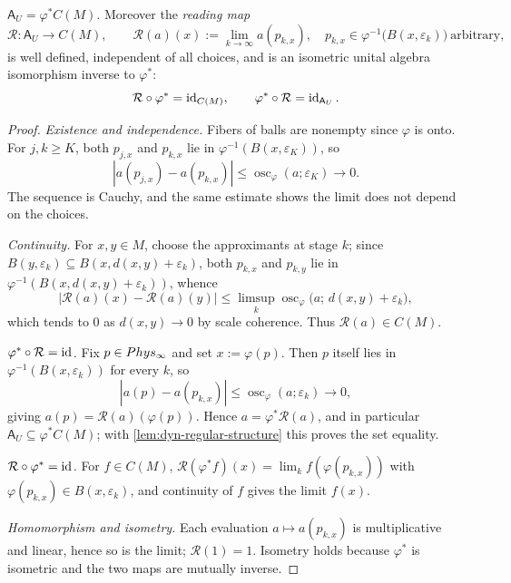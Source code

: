 \begin{theorem}
	\label{thm:dyn-regular-identification}
	\(\mathsf A_U=\varphi^*C(M)\). Moreover the \emph{reading map}
	\[
		\mathcal R:\mathsf A_U\longrightarrow C(M),
		\qquad
		\mathcal R(a)(x):=\lim_{k\to\infty}a(p_{k,x}),
		\quad
		p_{k,x}\in\varphi^{-1}\bigl(B(x,\varepsilon_k)\bigr)
		\ \text{arbitrary},
	\]
	is well defined, independent of all choices, and is an isometric
	unital algebra isomorphism inverse to \(\varphi^*\):
	\[
		\mathcal R\circ\varphi^*=\operatorname{id}_{C(M)},
		\qquad
		\varphi^*\circ\mathcal R=\operatorname{id}_{\mathsf A_U}.
	\]
\end{theorem}
\begin{proof}
	\emph{Existence and independence.}
	Fibers of balls are nonempty since \(\varphi\) is onto. For
	\(j,k\ge K\), both \(p_{j,x}\) and \(p_{k,x}\) lie in
	\(\varphi^{-1}(B(x,\varepsilon_K))\), so
	\[
		|a(p_{j,x})-a(p_{k,x})|
		\le\operatorname{osc}_\varphi(a;\varepsilon_K)\to0.
	\]
	The sequence is Cauchy, and the same estimate shows the limit does
	not depend on the choices.

	\emph{Continuity.}
	For \(x,y\in M\), choose the approximants at stage \(k\); since
	\(B(y,\varepsilon_k)\subseteq B(x,d(x,y)+\varepsilon_k)\), both
	\(p_{k,x}\) and \(p_{k,y}\) lie in
	\(\varphi^{-1}(B(x,d(x,y)+\varepsilon_k))\), whence
	\[
		|\mathcal R(a)(x)-\mathcal R(a)(y)|
		\le
		\limsup_k\operatorname{osc}_\varphi
		\bigl(a;\,d(x,y)+\varepsilon_k\bigr),
	\]
	which tends to \(0\) as \(d(x,y)\to0\) by scale coherence. Thus
	\(\mathcal R(a)\in C(M)\).

	\emph{\(\varphi^*\circ\mathcal R=\operatorname{id}\).}
	Fix \(p\in Phys_\infty\) and set \(x:=\varphi(p)\). Then \(p\)
	itself lies in \(\varphi^{-1}(B(x,\varepsilon_k))\) for every
	\(k\), so
	\[
		|a(p)-a(p_{k,x})|
		\le\operatorname{osc}_\varphi(a;\varepsilon_k)\to0,
	\]
	giving \(a(p)=\mathcal R(a)(\varphi(p))\). Hence
	\(a=\varphi^*\mathcal R(a)\), and in particular
	\(\mathsf A_U\subseteq\varphi^*C(M)\); with
	\cref{lem:dyn-regular-structure} this proves the set equality.

	\emph{\(\mathcal R\circ\varphi^*=\operatorname{id}\).}
	For \(f\in C(M)\),
	\(\mathcal R(\varphi^*f)(x)=\lim_k f(\varphi(p_{k,x}))\) with
	\(\varphi(p_{k,x})\in B(x,\varepsilon_k)\), and continuity of \(f\)
	gives the limit \(f(x)\).

	\emph{Homomorphism and isometry.}
	Each evaluation \(a\mapsto a(p_{k,x})\) is multiplicative and
	linear, hence so is the limit; \(\mathcal R(1)=1\). Isometry holds
	because \(\varphi^*\) is isometric and the two maps are mutually
	inverse.
\end{proof}

